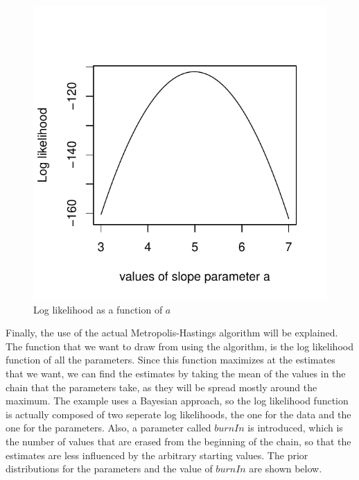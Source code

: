 \documentclass[a4paper,10pt]{article}\usepackage[]{graphicx}\usepackage[]{color}
\makeatletter
\def\maxwidth{ %
  \ifdim\Gin@nat@width>\linewidth
    \linewidth
  \else
    \Gin@nat@width
  \fi
}
\newenvironment{knitrout}{}{} %
\makeatother
\begin{document}
\begin{figure}[H]
\begin{knitrout}
\color{fgcolor}

{\centering \includegraphics[width=\maxwidth]{figure/log_likelihood-1} 

}



\end{knitrout}
\caption{Log likelihood as a function of $a$}\label{loglik}
\end{figure}

\noindent Finally, the use of the actual Metropolis-Hastings algorithm will be explained. The function that we want to draw from using the algorithm, is the log likelihood function of all the parameters. Since this function maximizes at the estimates that we want, we can find the estimates by taking the mean of the values in the chain that the parameters take, as they will be spread mostly around the maximum. The example uses a Bayesian approach, so the log likelihood function is actually composed of two seperate log likelihoods, the one for the data and the one for the parameters. Also, a parameter called $burnIn$ is introduced, which is the number of values that are erased from the beginning of the chain, so that the estimates are less influenced by the arbitrary starting values. The prior distributions for the parameters and the value of $burnIn$ are shown below.
\end{document}
